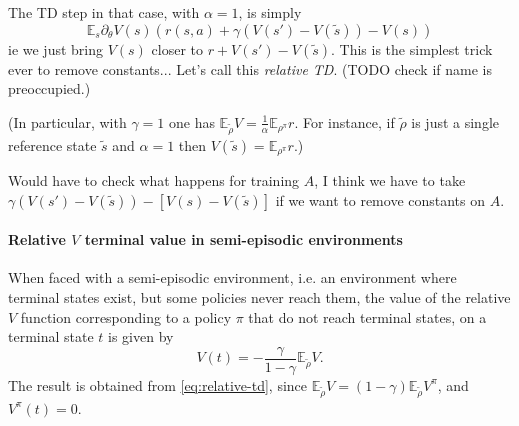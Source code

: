 \documentclass[11pt]{article}
\newcommand{\E}{\mathbb{E}}
\begin{document}
The TD step in that case, with $\alpha=1$, is simply
\begin{equation}
\E_s \partial_\theta V(s) \left(
r(s,a)+\gamma(V(s')-V(\tilde s))-V(s)\right)
\end{equation}
ie we just bring $V(s)$ closer to $r+V(s')-V(\tilde s)$. This is the
simplest trick ever to remove constants... Let's call this \emph{relative
TD}. (TODO check if name is preoccupied.)

(In particular, with $\gamma=1$ one
has $\E_{\tilde \rho}V=\frac{1}{\alpha}\E_{\rho^\pi}r$. For instance, if $\tilde \rho$ is
just a single reference
state $\tilde s$ and $\alpha=1$ then 
$V(\tilde s)=\E_{\rho^\pi}r$.)

Would have to check what happens for training $A$, I think we have to
take $\gamma(V(s')-V(\tilde s))-[V(s)-V(\tilde s)]$ if we want to remove
constants on $A$.

\paragraph{Relative $V$ terminal value in semi-episodic environments} When
faced with a semi-episodic environment, i.e. an environment where terminal
states exist, but some policies never reach them, the value of the relative
$V$ function corresponding to a policy $\pi$ that do not reach terminal states,
on a terminal state $t$ is given by
\begin{equation}
	V(t) = - \frac{\gamma}{1 - \gamma} \E_{\tilde{\rho}} V.
\end{equation}
The result is obtained from \eqref{eq:relative-td}, since $\E_{\tilde{\rho}} V = (1 - \gamma)
\E_{\tilde{\rho}} V^\pi$, and $V^\pi(t) = 0$.
\end{document}
